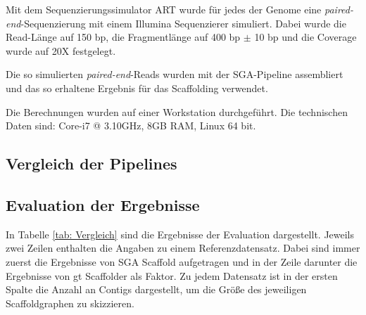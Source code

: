 \documentclass[a4paper,10pt,parskip]{scrartcl}
\begin{document}
Mit dem Sequenzierungssimulator ART \cite{Huang:2012kq} wurde für jedes
der Genome eine \textit{paired-end}-Sequenzierung mit einem Illumina
Sequenzierer simuliert. Dabei wurde die Read-Länge auf 150 bp, die
Fragmentlänge auf 400 bp $\pm$ 10 bp und die Coverage wurde auf 20X
festgelegt.

Die so simulierten \textit{paired-end}-Reads wurden mit der
SGA-Pipeline assembliert und das so erhaltene Ergebnis für das
Scaffolding verwendet.

Die Berechnungen wurden auf einer Workstation durchgeführt. Die
technischen Daten sind: Core-i7 @ 3.10GHz, 8GB RAM, Linux 64 bit.

\subsection{Vergleich der Pipelines}

\subsection{Evaluation der Ergebnisse}

In Tabelle \ref{tab: Vergleich} sind die Ergebnisse der Evaluation
dargestellt. Jeweils zwei Zeilen enthalten die Angaben zu einem
Referenzdatensatz. Dabei sind immer zuerst die Ergebnisse von SGA
Scaffold aufgetragen und in der Zeile darunter die Ergebnisse von gt
Scaffolder als Faktor. Zu jedem Datensatz ist in der ersten Spalte die
Anzahl an Contigs dargestellt, um die Größe des jeweiligen
Scaffoldgraphen zu skizzieren.
\end{document}
